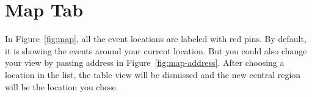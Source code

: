 \section{Map Tab} %
\label{sec:map_tab}

In Figure~\ref{fig:map}, all the event locations are labeled with red pins. By default, it is showing the events around your current location. But you could also change your view by passing address in Figure~\ref{fig:map-address}. After choosing a location in the list, the table view will be dismissed and the new central region will be the location you chose. 

\begin{figure}
	\centering
	 \hfill

\end{figure}
